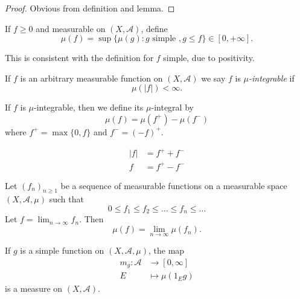 \documentclass[a4paper]{article}
\begin{document}
\begin{proof}
  Obvious from definition and lemma.
\end{proof}

\begin{definition}
  If \(f \geq 0\) and measurable on \((X, \mathcal A)\), define
  \[
    \mu(f) = \sup \{\mu(g): g \text{ simple }, g \leq f\} \in [0, +\infty].
  \]
\end{definition}

\begin{remark}
  This is consistent with the definition for \(f\) simple, due to positivity.
\end{remark}

\begin{definition}[integrable]
  If \(f\) is an arbitrary measurable function on \((X, \mathcal A)\) we say \(f\) is \emph{\(\mu\)-integrable} if
  \[
    \mu(|f|) < \infty.
  \]
\end{definition}

\begin{definition}
  If \(f\) is \(\mu\)-integrable, then we define its \(\mu\)-integral by
  \[
    \mu(f) = \mu(f^+) - \mu(f^-)
  \]
  where \(f^+ = \max\{0, f\}\) and \(f^- = (-f)^+\).
\end{definition}

\begin{note}
  \begin{align*}
    |f| &= f^+ + f^- \\
    f &= f^+ - f^-
  \end{align*}
\end{note}

\begin{theorem}
  \label{thm:monotone convergence theorem}
  Let \((f_n)_{n \geq 1}\) be a sequence of measurable functions on a measurable space \((X, \mathcal A, \mu)\) such that
  \[
    0 \leq f_1 \leq f_2 \leq \dots \leq f_n \leq \dots
  \]
  Let \(f = \lim_{n \to \infty} f_n\). Then
  \[
    \mu(f) = \lim_{n \to \infty} \mu(f_n).
  \]
\end{theorem}

\begin{lemma}
  If \(g\) is a simple function on \((X, \mathcal A, \mu)\), the map
  \begin{align*}
    m_g: \mathcal A &\to [0, \infty] \\
    E &\mapsto \mu(1_E g)
  \end{align*}
  is a measure on \((X, \mathcal A)\).
\end{lemma}
\end{document}
